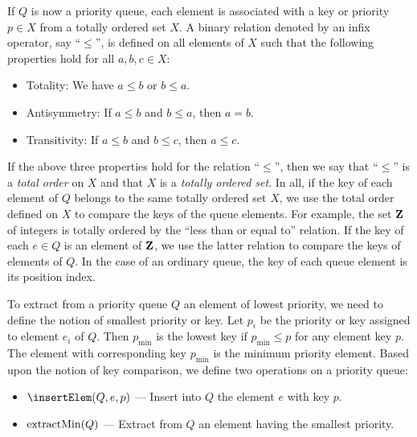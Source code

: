 If $Q$ is now a priority queue, each element is associated with a key
or priority $p \in X$ from a totally ordered set
$X$. A binary relation denoted by an infix operator, say ``$\leq$'',
is defined on all elements of $X$ such that the following properties
hold for all $a,b,c \in X$:
\begin{itemize}
\item Totality: We have $a \leq b$ or $b \leq a$.

\item Antisymmetry: If $a \leq b$ and $b \leq a$, then $a = b$.

\item Transitivity: If $a \leq b$ and $b \leq c$, then $a \leq c$.
\end{itemize}
If the above three properties hold for the relation ``$\leq$'', then we
say that ``$\leq$'' is a \emph{total order} on $X$
and that $X$ is a
\emph{totally ordered set}. In all, if the
key of each element of $Q$ belongs to the same totally ordered
set $X$, we use the total order defined on $X$ to compare the keys of
the queue elements. For example, the set $\mathbf{Z}$ of integers is totally
ordered by the ``less than or equal to'' relation. If the key of each
$e \in Q$ is an element of $\mathbf{Z}$, we use the latter relation to compare
the keys of elements of $Q$. In the case of an ordinary queue, the
key of each queue element is its position index.

To extract from a priority queue $Q$ an element
of lowest priority, we need to define the notion of smallest
priority or key. Let $p_i$ be the priority or key assigned to element
$e_i$ of $Q$. Then $p_{\min}$ is the lowest key if $p_{\min} \leq p$
for any element key $p$. The element with corresponding key
$p_{\min}$ is the minimum priority element. Based upon the notion of
key comparison, we define two operations on a priority queue:
\begin{itemize}
\item $\insertElem(Q, e, p)$ --- Insert into $Q$ the element $e$ with
  key $p$.

\item $\operatorname*{extractMin}(Q)$ --- Extract from $Q$ an element having the
  smallest priority.
\end{itemize}


